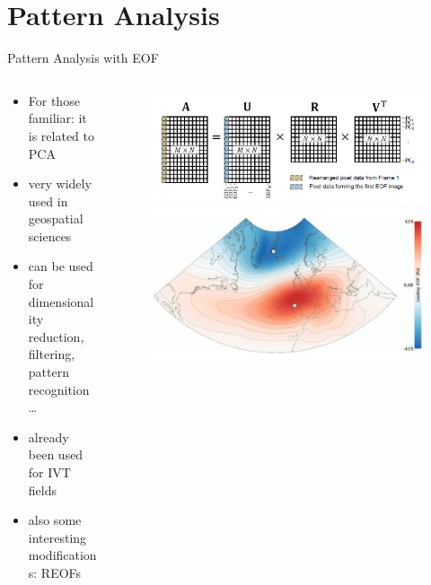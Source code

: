 \section{Pattern Analysis}

\begin{frame}{Pattern Analysis with EOF}
  \begin{columns}
    \begin{column}{.5\textwidth}
      \begin{itemize}
        \item For those familiar: it is related to PCA
        \item very widely used in geospatial sciences \cite{hannachi_empirical_2007}
        \item can be used for dimensionality reduction, filtering, pattern recognition \dots
        \item already been used for IVT fields \cite{ayantobo_integrated_2022}
        \item also some interesting modifications: REOFs
      \end{itemize} 
      
    \end{column}
    \begin{column}{.5\textwidth}
    \begin{figure}[t]
      \centering
      \includegraphics[width=\columnwidth]{imglib/svd_matrices.png}
      \includegraphics[width=.7\columnwidth]{imglib/nao_eof_index.png}
    \end{figure}

    \end{column}
    
  \end{columns}
\end{frame}

